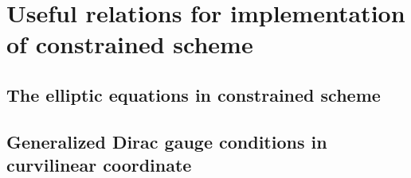 \chapter{Useful relations for implementation of constrained scheme}

\section{The elliptic equations in constrained scheme}
\section{Generalized Dirac gauge conditions in curvilinear coordinate}
